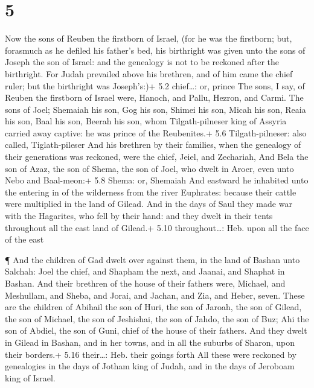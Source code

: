 \hypertarget{section-4}{%
\section{5}\label{section-4}}

 Now the sons of Reuben the firstborn of Israel, (for he was
the firstborn; but, forasmuch as he defiled his father's bed, his
birthright was given unto the sons of Joseph the son of Israel: and the
genealogy is not to be reckoned after the birthright.  For
Judah prevailed above his brethren, and of him came the chief ruler; but
the birthright was Joseph's:)+ 5.2 chief\ldots: or, prince 
The sons, I say, of Reuben the firstborn of Israel were, Hanoch, and
Pallu, Hezron, and Carmi.  The sons of Joel; Shemaiah his
son, Gog his son, Shimei his son,  Micah his son, Reaia his
son, Baal his son,  Beerah his son, whom Tilgath-pilneser
king of Assyria carried away captive: he was prince of the Reubenites.+
5.6 Tilgath-pilneser: also called, Tiglath-pileser  And his
brethren by their families, when the genealogy of their generations was
reckoned, were the chief, Jeiel, and Zechariah,  And Bela
the son of Azaz, the son of Shema, the son of Joel, who dwelt in Aroer,
even unto Nebo and Baal-meon:+ 5.8 Shema: or, Shemaiah  And
eastward he inhabited unto the entering in of the wilderness from the
river Euphrates: because their cattle were multiplied in the land of
Gilead.  And in the days of Saul they made war with the
Hagarites, who fell by their hand: and they dwelt in their tents
throughout all the east land of Gilead.+ 5.10 throughout\ldots: Heb.
upon all the face of the east

 ¶ And the children of Gad dwelt over against them, in the
land of Bashan unto Salchah:  Joel the chief, and Shapham
the next, and Jaanai, and Shaphat in Bashan.  And their
brethren of the house of their fathers were, Michael, and Meshullam, and
Sheba, and Jorai, and Jachan, and Zia, and Heber, seven. 
These are the children of Abihail the son of Huri, the son of Jaroah,
the son of Gilead, the son of Michael, the son of Jeshishai, the son of
Jahdo, the son of Buz;  Ahi the son of Abdiel, the son of
Guni, chief of the house of their fathers.  And they dwelt
in Gilead in Bashan, and in her towns, and in all the suburbs of Sharon,
upon their borders.+ 5.16 their\ldots: Heb. their goings forth
 All these were reckoned by genealogies in the days of
Jotham king of Judah, and in the days of Jeroboam king of Israel.

